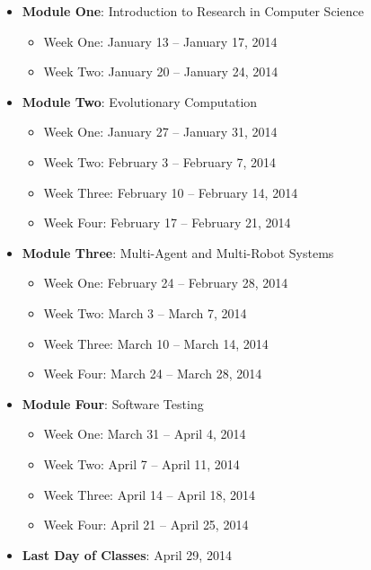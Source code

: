 \begin{itemize}
  
  \item {\bf Module One}: Introduction to Research in Computer Science
    
    \begin{itemize}
    	\item Week One: January 13 -- January 17, 2014
	\item Week Two: January 20 -- January 24, 2014
    \end{itemize}
  
  \item {\bf Module Two}: Evolutionary Computation
    
    \begin{itemize}
    	\item Week One: January 27 -- January 31, 2014
	\item Week Two: February 3 -- February 7, 2014
	\item Week Three: February 10 -- February 14, 2014
	\item Week Four: February 17 -- February 21, 2014
    \end{itemize}
  
  \item {\bf Module Three}: Multi-Agent and Multi-Robot Systems 
    
    \begin{itemize}
    	\item Week One: February 24 -- February 28, 2014
	\item Week Two: March 3 -- March 7, 2014
	\item Week Three: March 10 -- March 14, 2014
	\item Week Four: March 24 -- March 28, 2014
    \end{itemize}

  \item {\bf Module Four}: Software Testing
    
    \begin{itemize}
    	\item Week One: March 31 -- April 4, 2014
	\item Week Two: April 7 -- April 11, 2014
	\item Week Three: April 14 -- April 18, 2014
	\item Week Four: April 21 -- April 25, 2014
    \end{itemize}

    \item {\bf Last Day of Classes}: April 29, 2014

\end{itemize}

